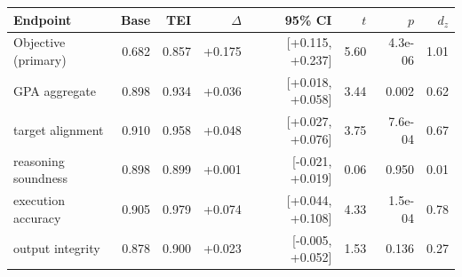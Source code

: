 \begin{tabular}{lrrrrrrr}
\toprule
Endpoint & Base & TEI & $\Delta$ & 95\% CI & $t$ & $p$ & $d_z$ \\
\midrule
Objective (primary) & 0.682 & 0.857 & +0.175 & [+0.115, +0.237] & 5.60 & 4.3e-06 & 1.01 \\
GPA aggregate & 0.898 & 0.934 & +0.036 & [+0.018, +0.058] & 3.44 & 0.002 & 0.62 \\
\midrule
\quad target alignment & 0.910 & 0.958 & +0.048 & [+0.027, +0.076] & 3.75 & 7.6e-04 & 0.67 \\
\quad reasoning soundness & 0.898 & 0.899 & +0.001 & [-0.021, +0.019] & 0.06 & 0.950 & 0.01 \\
\quad execution accuracy & 0.905 & 0.979 & +0.074 & [+0.044, +0.108] & 4.33 & 1.5e-04 & 0.78 \\
\quad output integrity & 0.878 & 0.900 & +0.023 & [-0.005, +0.052] & 1.53 & 0.136 & 0.27 \\
\bottomrule
\end{tabular}